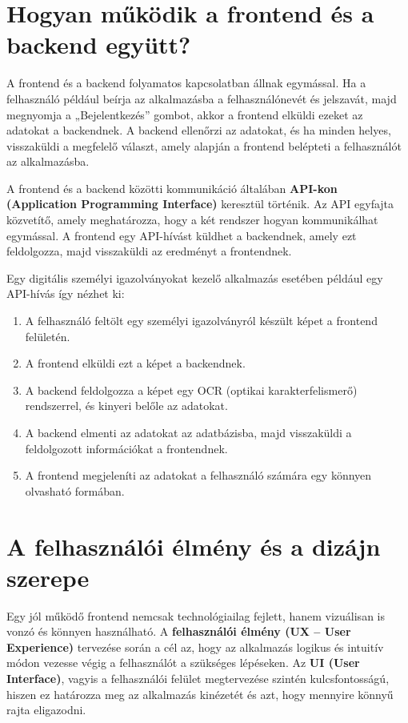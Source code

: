 \documentclass[
]{thesis-ekf}
\theoremstyle{definition}
\theoremstyle{remark}
\begin{document}
	\section{Hogyan működik a frontend és a backend együtt?}
	
	A frontend és a backend folyamatos kapcsolatban állnak egymással. Ha a felhasználó például beírja az alkalmazásba a felhasználónevét és jelszavát, majd megnyomja a „Bejelentkezés” gombot, akkor a frontend elküldi ezeket az adatokat a backendnek. A backend ellenőrzi az adatokat, és ha minden helyes, visszaküldi a megfelelő választ, amely alapján a frontend belépteti a felhasználót az alkalmazásba.
	
	A frontend és a backend közötti kommunikáció általában \textbf{API-kon (Application Programming Interface)} keresztül történik. Az API egyfajta közvetítő, amely meghatározza, hogy a két rendszer hogyan kommunikálhat egymással. A frontend egy API-hívást küldhet a backendnek, amely ezt feldolgozza, majd visszaküldi az eredményt a frontendnek.
	
	Egy digitális személyi igazolványokat kezelő alkalmazás esetében például egy API-hívás így nézhet ki:
	\begin{enumerate}
		\item A felhasználó feltölt egy személyi igazolványról készült képet a frontend felületén.
		\item A frontend elküldi ezt a képet a backendnek.
		\item A backend feldolgozza a képet egy OCR (optikai karakterfelismerő) rendszerrel, és kinyeri belőle az adatokat.
		\item A backend elmenti az adatokat az adatbázisba, majd visszaküldi a feldolgozott információkat a frontendnek.
		\item A frontend megjeleníti az adatokat a felhasználó számára egy könnyen olvasható formában.
	\end{enumerate}
	\section{A felhasználói élmény és a dizájn szerepe}
	
	Egy jól működő frontend nemcsak technológiailag fejlett, hanem vizuálisan is vonzó és könnyen használható. A \textbf{felhasználói élmény (UX – User Experience)} tervezése során a cél az, hogy az alkalmazás logikus és intuitív módon vezesse végig a felhasználót a szükséges lépéseken. Az \textbf{UI (User Interface)}, vagyis a felhasználói felület megtervezése szintén kulcsfontosságú, hiszen ez határozza meg az alkalmazás kinézetét és azt, hogy mennyire könnyű rajta eligazodni.
	
\end{document}
